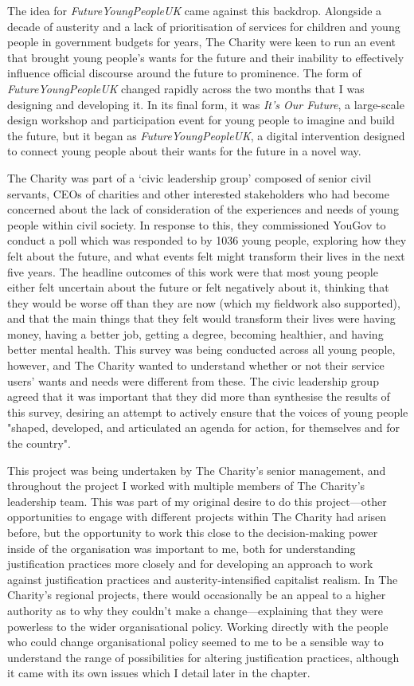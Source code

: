 The idea for \textit{FutureYoungPeopleUK} came against this backdrop. Alongside a decade of austerity and a lack of prioritisation of services for children and young people in government budgets for years, The Charity were keen to run an event that brought young people’s wants for the future and their inability to effectively influence official discourse around the future to prominence. The form of \emph{FutureYoungPeopleUK} changed rapidly across the two months that I was designing and developing it. In its final form, it was \emph{It’s Our Future}, a large-scale design workshop and participation event for young people to imagine and build the future, but it began as \emph{FutureYoungPeopleUK}, a digital intervention designed to connect young people about their wants for the future in a novel way. 

The Charity was part of a ‘civic leadership group’ composed of senior civil servants, CEOs of charities and other interested stakeholders who had become concerned about the lack of consideration of the experiences and needs of young people within civil society. In response to this, they commissioned YouGov to conduct a poll which was responded to by 1036 young people, exploring how they felt about the future, and what events felt might transform their lives in the next five years. The headline outcomes of this work were that most young people either felt uncertain about the future or felt negatively about it, thinking that they would be worse off than they are now (which my fieldwork also supported), and that the main things that they felt would transform their lives were having money, having a better job, getting a degree, becoming healthier, and having better mental health. This survey was being conducted across all young people,  however, and The Charity wanted to understand whether or not their service users' wants and needs were different from these. The civic leadership group agreed that it was important that they did more than synthesise the results of this survey, desiring an attempt to actively ensure that the voices of young people "shaped, developed, and articulated an agenda for action, for themselves and for the country". 

This project was being undertaken by The Charity's senior management, and throughout the project I worked with multiple members of The Charity's leadership team. This was part of my original desire to do this project—other opportunities to engage with different projects within The Charity had arisen before, but the opportunity to work this close to the decision-making power inside of the organisation was important to me, both for understanding justification practices more closely and for developing an approach to work against justification practices and austerity-intensified capitalist realism. In The Charity's regional projects, there would occasionally be an appeal to a higher authority as to why they couldn't make a change—explaining that they were powerless to the wider organisational policy. Working directly with the people who could change organisational policy seemed to me to be a sensible way to understand the range of possibilities for altering justification practices, although it came with its own issues which I detail later in the chapter.

